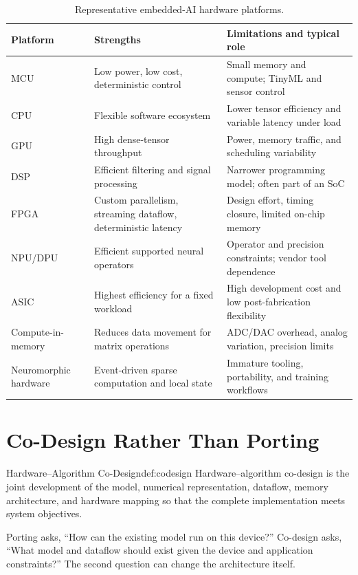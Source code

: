 \begin{table}[H]
\centering
\caption{Representative embedded-AI hardware platforms.}
\label{tab:platforms}
\begin{tabularx}{\textwidth}{@{}p{2.4cm}X X@{}}
\toprule
\textbf{Platform} & \textbf{Strengths} & \textbf{Limitations and typical role} \\
\midrule
MCU & Low power, low cost, deterministic control & Small memory and compute; TinyML and sensor control \\
CPU & Flexible software ecosystem & Lower tensor efficiency and variable latency under load \\
GPU & High dense-tensor throughput & Power, memory traffic, and scheduling variability \\
DSP & Efficient filtering and signal processing & Narrower programming model; often part of an SoC \\
FPGA & Custom parallelism, streaming dataflow, deterministic latency & Design effort, timing closure, limited on-chip memory \\
NPU/DPU & Efficient supported neural operators & Operator and precision constraints; vendor tool dependence \\
ASIC & Highest efficiency for a fixed workload & High development cost and low post-fabrication flexibility \\
Compute-in-memory & Reduces data movement for matrix operations & ADC/DAC overhead, analog variation, precision limits \\
Neuromorphic hardware & Event-driven sparse computation and local state & Immature tooling, portability, and training workflows \\
\bottomrule
\end{tabularx}
\end{table}

\section{Co-Design Rather Than Porting}

\begin{definition}{Hardware--Algorithm Co-Design}{def:codesign}
Hardware--algorithm co-design is the joint development of the model, numerical representation, dataflow, memory architecture, and hardware mapping so that the complete implementation meets system objectives.
\end{definition}

Porting asks, ``How can the existing model run on this device?'' Co-design asks, ``What model and dataflow should exist given the device and application constraints?'' The second question can change the architecture itself.

